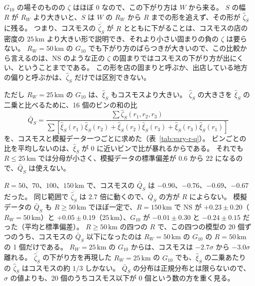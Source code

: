\documentclass[a4paper,11pt]{ltjsarticle}
\begin{document}
$G_{10}$ の場そのものの $\zeta$ はほぼ $0$ なので、この下がり方は $W$ から来る。
$S$ の幅 $R$ が $R_W$ より大きいと、$S$ は $W$ の $R_W$ から $R$ までの形を追えず、その形が $\hat\zeta_S$ に残る。
つまり、コスモスの $\overline{\hat\zeta_S}$ が $R$ とともに下がることは、コスモスの店の密度の $25\,\mathrm{km}$ より大きい形で説明でき、それより小さい固まりの負の $\zeta$ は要らない。
$R_W = 50\,\mathrm{km}$ の $G_{10}$ でも下がり方のばらつきが大きいので、この比較から言えるのは、NS のような正の $\zeta$ の固まりではコスモスの下がり方が出にくい、ということまでである。
この形を店の固まりと呼ぶか、出店している地方の偏りと呼ぶかは、$\hat\zeta_S$ だけでは区別できない。

ただし $R_W = 25\,\mathrm{km}$ の $G_{10}$ は、$\hat\xi_S$ もコスモスより大きい。
$\hat\zeta_S$ の大きさを $\hat\xi_S$ の二乗と比べるために、16 個のビンの和の比
\begin{equation}
  \bar Q_S = \frac{\sum \hat\zeta_S(r_1, r_2, r_3)}{\sum \left[\hat\xi_S(r_1)\hat\xi_S(r_2) + \hat\xi_S(r_2)\hat\xi_S(r_3) + \hat\xi_S(r_3)\hat\xi_S(r_1)\right]}
  \label{eq:q-bar}
\end{equation}
を、コスモスと模擬データ一つごとに求めた（表~\ref{tab:vary-r-q}）。
ビンごとの比を平均しないのは、$\hat\xi_S$ が $0$ に近いビンで比が暴れるからである。
それでも $R \le 25\,\mathrm{km}$ では分母が小さく、模擬データの標準偏差が $0.6$ から $22$ になるので、$\bar Q_S$ は使えない。

$R = 50$、$70$、$100$、$150\,\mathrm{km}$ で、コスモスの $\bar Q_S$ は $-0.90$、$-0.76$、$-0.69$、$-0.67$ だった。
同じ範囲で $\overline{\hat\zeta_S}$ は $2.7$ 倍に動くので、$\bar Q_S$ の方が $R$ によらない。
模擬データの $\bar Q_S$ も $R \ge 50\,\mathrm{km}$ でほぼ一定で、$R = 150\,\mathrm{km}$ で NS が $+0.23 \pm 0.20$（$R_W = 50\,\mathrm{km}$）と $+0.05 \pm 0.19$（$25\,\mathrm{km}$）、$G_{10}$ が $-0.01 \pm 0.30$ と $-0.24 \pm 0.15$ だった（平均と標準偏差）。
$R \ge 50\,\mathrm{km}$ の四つの $R$ で、この四つの模型の 20 個ずつのうち、コスモスの $\bar Q_S$ 以下になったのは $R_W = 50\,\mathrm{km}$ の $G_{10}$ の $R = 50\,\mathrm{km}$ の 1 個だけである。
$R_W = 25\,\mathrm{km}$ の $G_{10}$ からは、コスモスは $-2.7\sigma$ から $-3.0\sigma$ 離れる。
$\overline{\hat\zeta_S}$ の下がり方を再現した $R_W = 25\,\mathrm{km}$ の $G_{10}$ でも、$\hat\xi_S$ の二乗あたりの $\hat\zeta_S$ はコスモスの約 $1/3$ しかない。
$\bar Q_S$ の分布は正規分布とは限らないので、$\sigma$ の値よりも、20 個のうちコスモス以下が $0$ 個という数の方を重く見る。
\end{document}
